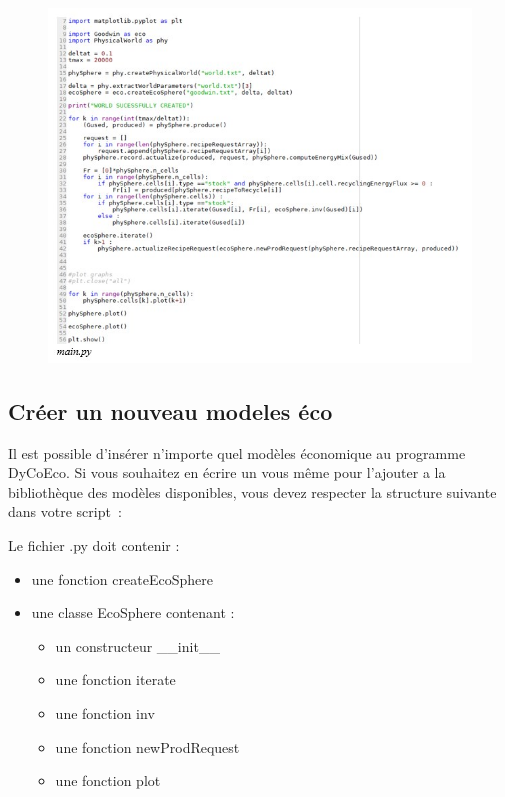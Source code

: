 \documentclass[12pt,a4paper]{article}%
\begin{document}
\begin{figure}[h]
\centering
\includegraphics[width=1.0\textwidth]{figures/Main-py.jpg}\end{figure}

\subsection{Créer un nouveau modeles éco}

Il est possible d'insérer n'importe quel modèles économique au programme
DyCoEco. Si vous souhaitez en écrire un vous même pour l'ajouter a la
bibliothèque des modèles disponibles, vous devez respecter la
structure suivante dans votre script~:

Le fichier .py doit contenir :

\begin{itemize}
\item une fonction createEcoSphere
\end{itemize}

\begin{itemize}
\item une classe EcoSphere contenant :

\begin{itemize}
\item un constructeur \_\_init\_\_

\item une fonction iterate

\item une fonction inv

\item une fonction newProdRequest

\item une fonction plot
\end{itemize}
\end{itemize}
\end{document}
